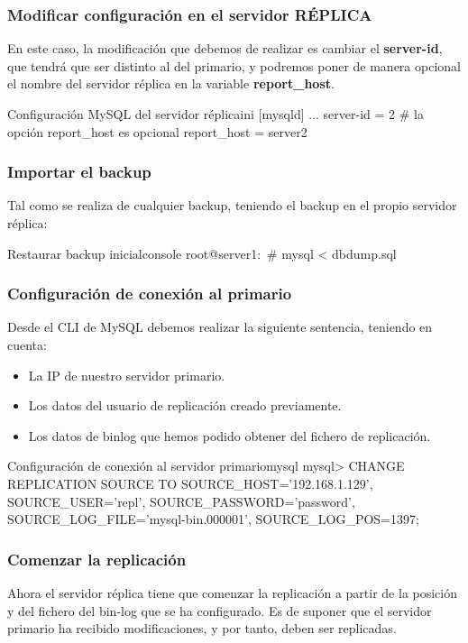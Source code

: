 \subsubsection{Modificar configuración en el servidor RÉPLICA}
En este caso, la modificación que debemos de realizar es cambiar el \textbf{server-id}, que tendrá que ser distinto al del primario, y podremos poner de manera opcional el nombre del servidor réplica en la variable \textbf{report\_host}.


\begin{mycode}{Configuración MySQL del servidor réplica}{ini}{}
[mysqld]
...
server-id = 2
# la opción report_host es opcional
report_host = server2
\end{mycode}


\subsubsection{Importar el backup}
Tal como se realiza de cualquier backup, teniendo el backup en el propio servidor réplica:

\begin{mycode}{Restaurar backup inicial}{console}{}
root@server1:~# mysql < dbdump.sql
\end{mycode}


\subsubsection{Configuración de conexión al primario}
Desde el CLI de MySQL debemos realizar la siguiente sentencia, teniendo en cuenta:
\begin{itemize}
    \item La IP de nuestro servidor primario.
    \item Los datos del usuario de replicación creado previamente.
    \item Los datos de binlog que hemos podido obtener del fichero de replicación.
\end{itemize}

\begin{mycode}{Configuración de conexión al servidor primario}{mysql}{}
mysql> CHANGE REPLICATION SOURCE TO
          SOURCE_HOST='192.168.1.129',
          SOURCE_USER='repl',
          SOURCE_PASSWORD='password',
          SOURCE_LOG_FILE='mysql-bin.000001',
          SOURCE_LOG_POS=1397;
\end{mycode}

\subsubsection{Comenzar la replicación}
Ahora el servidor réplica tiene que comenzar la replicación a partir de la posición y del fichero del bin-log que se ha configurado. Es de suponer que el servidor primario ha recibido modificaciones, y por tanto, deben ser replicadas.


